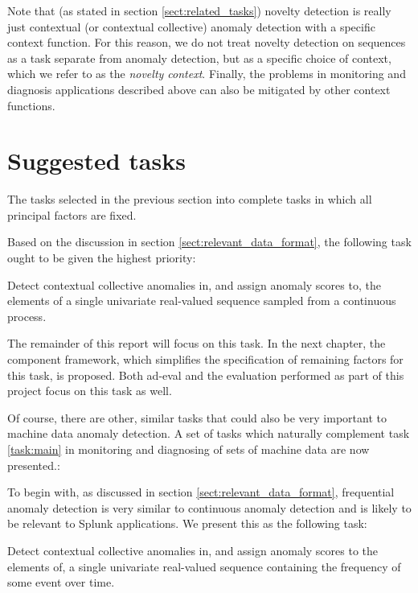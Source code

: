Note that (as stated in section \ref{sect:related_tasks}) novelty detection is really just contextual (or contextual collective) anomaly detection with a specific context function. For this reason, we do not treat novelty detection on sequences as a task separate from anomaly detection, but as a specific choice of context, which we refer to as the \emph{novelty context}. Finally, the problems in monitoring and diagnosis applications described above can also be mitigated by other context functions. 

\section{Suggested tasks}
\label{sect:suggested_tasks}

The tasks selected in the previous section into complete tasks in which all principal factors are fixed.

Based on the discussion in section \ref{sect:relevant_data_format}, the following task ought to be given the highest priority:
\begin{task}
  \label{task:main}
  Detect contextual collective anomalies in, and assign anomaly scores to, the elements of a single univariate real-valued sequence sampled from a continuous process.
\end{task}

The remainder of this report will focus on this task. In the next chapter, the component framework, which simplifies the specification of remaining factors for this task, is proposed. Both ad-eval and the evaluation performed as part of this project focus on this task as well.

Of course, there are other, similar tasks that could also be very important to machine data anomaly detection. A set of tasks which naturally complement task \ref{task:main} in monitoring and diagnosing of sets of machine data are now presented.:

To begin with, as discussed in section \ref{sect:relevant_data_format}, frequential anomaly detection is very similar to continuous anomaly detection and is likely to be relevant to Splunk applications. We present this as the following task:

\begin{task}
  Detect contextual collective anomalies in, and assign anomaly scores to the elements of, a single univariate real-valued sequence containing the frequency of some event over time.
\end{task}

